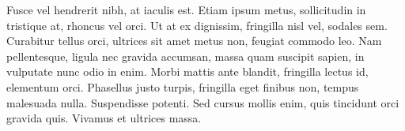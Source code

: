 Fusce vel hendrerit nibh, at iaculis est. Etiam ipsum metus, sollicitudin in tristique at, rhoncus vel orci. Ut at ex dignissim, fringilla nisl vel, sodales sem. Curabitur tellus orci, ultrices sit amet metus non, feugiat commodo leo. Nam pellentesque, ligula nec gravida accumsan, massa quam suscipit sapien, in vulputate nunc odio in enim. Morbi mattis ante blandit, fringilla lectus id, elementum orci. Phasellus justo turpis, fringilla eget finibus non, tempus malesuada nulla. Suspendisse potenti. Sed cursus mollis enim, quis tincidunt orci gravida quis. Vivamus et ultrices massa.

